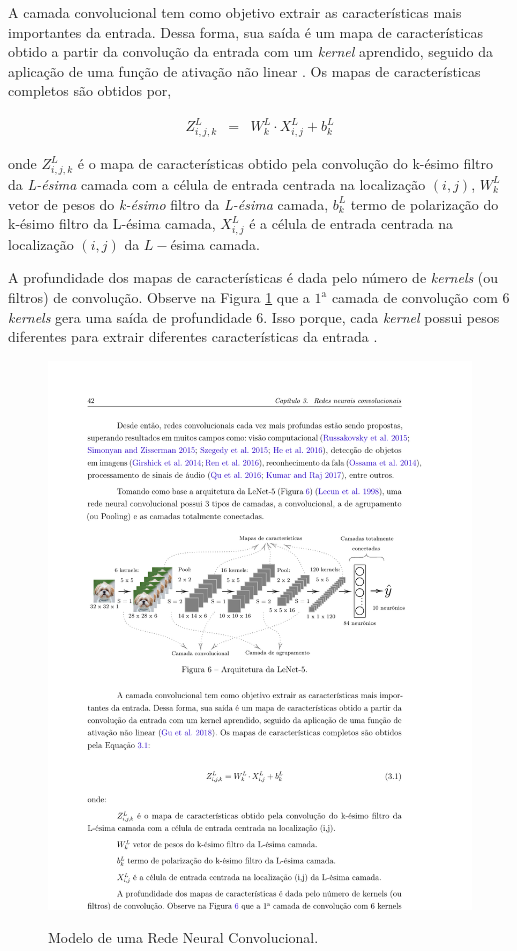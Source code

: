 A camada convolucional tem como objetivo extrair as características mais importantes da entrada. Dessa forma, sua saída é um mapa de características obtido a partir da convolução da entrada com um \textit{kernel} aprendido, seguido da aplicação de uma função de ativação não linear \cite{lucas_2019}. Os mapas de características completos são obtidos por,
 
 \begin{eqnarray}
 	Z_{i, j, k}^L&=&W_k^L \cdot X_{i, j}^L+b_k^L\label{cnn}
 \end{eqnarray}
 
\noindent onde $Z_{i, j, k}^L$ é o mapa de características obtido pela convolução do k-ésimo filtro da \textit{L-ésima} camada com a célula de entrada centrada na localização $(i, j)$, $W_k^L$ vetor de pesos do \textit{k-ésimo} filtro da \textit{L-ésima} camada, $b_k^L$ termo de polarização do k-ésimo filtro da L-ésima camada,  $X_{i, j}^L$ é a célula de entrada centrada na localização $(i,j)$ da $L-$ésima camada.

A profundidade dos mapas de características é dada pelo número de \textit{kernels} (ou filtros) de convolução. Observe na Figura \ref{fig:cnn} que a $1^{\mathrm{a}}$
camada de convolução com 6 \textit{kernels} gera uma saída de profundidade 6. Isso porque, cada \textit{kernel} possui pesos diferentes para extrair diferentes características da entrada \cite{lucas_2019}.
 
 \begin{figure}[!htb]
 	\centering
 	\caption{Modelo de uma Rede Neural Convolucional.}
 	\includegraphics[width=1\linewidth]{Modelos/Figuras/cnn.pdf}
 	\label{fig:cnn}
 \end{figure}
  
